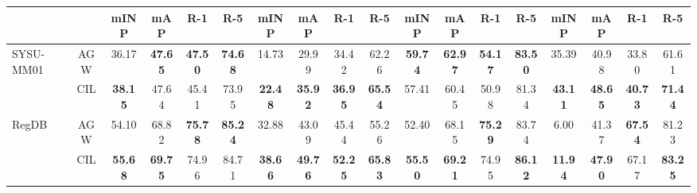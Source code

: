 \begin{table}[t]
\begin{tabular}{lc|cccc|cccc|cccc|cccc}
                                   &                         & mINP                             & mAP                                  & R-1                              & R-5                          & mINP           & mAP            & R-1            & R-5            & mINP           & mAP            & R-1            & R-5            & mINP           & mAP            & R-1            & R-5            \\
        \hline
        \multirow{2}{*}{SYSU-MM01} & AGW                     & 36.17                            & \textbf{47.65}                       & \textbf{47.50}                   & \textbf{74.68}               & 14.73          & 29.99          & 34.42          & 62.26          & \textbf{59.74} & \textbf{62.97} & \textbf{54.17} & \textbf{83.50} & 35.39          & 40.98          & 33.80          & 61.61          \\
                                   & CIL                     & \textbf{38.15}                   & 47.64                                & 45.41                            & 73.95                        & \textbf{22.48} & \textbf{35.92} & \textbf{36.95} & \textbf{65.54} & 57.41          & 60.45          & 50.98          & 81.34          & \textbf{43.11} & \textbf{48.65} & \textbf{40.73} & \textbf{71.44} \\
        \hline
        \multirow{2}{*}{RegDB}     & AGW                     & 54.10                            & 68.82                                & \textbf{75.78}                   & \textbf{85.24}               & 32.88          & 43.09          & 45.44          & 55.26          & 52.40          & 68.15          & \textbf{75.29} & 83.74          & 6.00           & 41.37          & \textbf{67.54} & 81.23          \\
                                   & CIL                     & \textbf{55.68}                   & \textbf{69.75}                       & 74.96                            & 84.71                        & \textbf{38.66} & \textbf{49.76} & \textbf{52.25} & \textbf{65.83} & \textbf{55.50} & \textbf{69.21} & 74.95          & \textbf{86.12} & \textbf{11.94} & \textbf{47.90} & 67.17          & \textbf{83.25} \\

        \hline
    \end{tabular}
    \vspace{-1mm}
    \label{tab:baseline_thermal}
\end{table}
 
